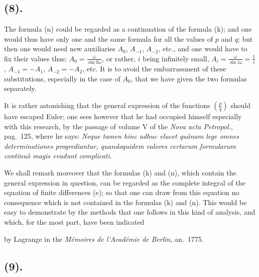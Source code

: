 \documentclass{article}
\begin{document}
\subsection*{(8).}

The formula (n) could be regarded as a continuation of the formula (k); and one would thus have only one and the same formula for all the values of $p$ and $q$; but then one would need new auxiliaries $A_{0}$, $A_{-1}$, $A_{-2}$, etc., and one would have to fix their values thus: $A_{0}=\frac{\omega}{\sin 0\omega}$, or rather, $i$ being infinitely small, $A_{i}=\frac{\omega}{\sin i\omega}=\frac{1}{i}$, $A_{-1}=-A_{1}$, $A_{-2}=-A_{2}$, etc. It is to avoid the embarrassment of these substitutions, especially in the case of $A_{0}$, that we have given the two formulas separately.

It is rather astonishing that the general expression of the functions $\left(\frac{p}{q}\right)$ should have escaped Euler; one sees however that he had occupied himself especially with this research, by the passage of volume V of the \emph{Nova acta Petropol.}, pag.\ 125, where he says: \emph{Neque tamen hinc adhuc elucet quânam lege omnes determinationes progrediantur, quandoquidem valores certarum formularum continuò magis evadunt complicati.}

We shall remark moreover that the formulas (k) and (n), which contain the general expression in question, can be regarded as the complete integral of the equation of finite differences (e); so that one can draw from this equation no consequence which is not contained in the formulas (k) and (n). This would be easy to demonstrate by the methods that one follows in this kind of analysis, and which, for the most part, have been indicated

by Lagrange in the \emph{Mémoires de l'Académie de Berlin}, an.\ 1775.

\subsection*{(9).}
\end{document}
